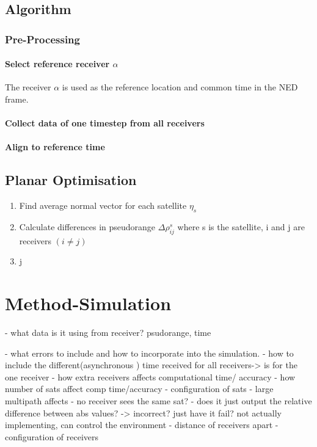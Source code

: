 \documentclass[11pt,a4paper]{article}
\begin{document}
\subsection{Algorithm}

\subsubsection{Pre-Processing}
\paragraph{Select reference receiver $\alpha$}
The receiver $\alpha$ is used as the reference location and common time in the NED frame. 
\paragraph{Collect data of one timestep from all receivers}

\paragraph{Align to reference time}


\subsection{Planar Optimisation}
\begin{enumerate}
\item Find average normal vector for each satellite $\eta_s$
\item Calculate differences in pseudorange $\Delta\rho^s_{ij}$ where s is the satellite, i and j are receivers $(i\neq j)$
\item j
\end{enumerate}


\section{Method-Simulation}
- what data is it using from receiver? psudorange, time

- what errors to include and how to incorporate into the simulation.
- how to include the different(asynchronous ) time received for all receivers-> is for the one receiver 
- how extra receivers affects computational time/ accuracy
- how number of sats affect comp time/accuracy
- configuration of sats
- large multipath affects
- no receiver sees the same sat? - does it just output the relative difference between abs values? -> incorrect? just have it fail? not actually implementing, can control the environment
- distance of receivers apart
- configuration of receivers
\end{document}
